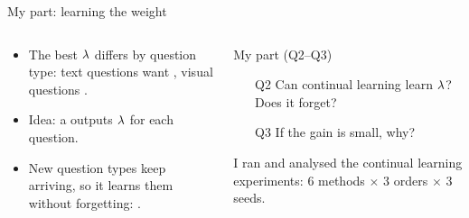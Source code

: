 \documentclass[aspectratio=169,11pt]{beamer}
\subtitle{Part 2: Can Continual Learning Learn the Weight? (Q2--Q3)}
\author[Longtao Jiang]{Longtao Jiang \\ \small with Jianxiang He and Makhmud Assentay}
\begin{document}
\titleframe
{}
\contextframe

\begin{frame}{My part: learning the weight}
  \begin{columns}[T,onlytextwidth]
    \begin{column}{0.5\textwidth}
      \begin{itemize}
        \item The best $\lambda$ differs by question type: text questions want , visual questions .
        \item Idea: a  outputs $\lambda$ for each question.
        \item New question types keep arriving, so it learns them  without forgetting: .
      \end{itemize}
    \end{column}
    \begin{column}{0.46\textwidth}
      \begin{block}{My part (Q2--Q3)}
        \begin{itemize}
          \item[Q2] Can continual learning learn $\lambda$? Does it forget?
          \item[Q3] If the gain is small, why?
        \end{itemize}
      \end{block}
      \small I ran and analysed the continual learning experiments: 6 methods $\times$ 3 orders $\times$ 3 seeds.
    \end{column}
  \end{columns}
\end{frame}
\end{document}
